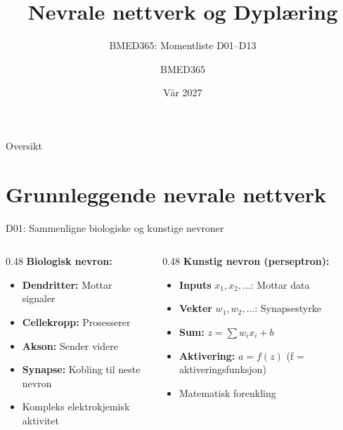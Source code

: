\documentclass[aspectratio=169, 10pt]{beamer}
\title{Nevrale nettverk og Dyplæring}
\subtitle{BMED365: Momentliste D01--D13}
\author{BMED365}
\date{Vår 2027}
\begin{document}
\begin{frame}
    \titlepage
\end{frame}

\begin{frame}{Oversikt}
    \tableofcontents
\end{frame}

\section{Grunnleggende nevrale nettverk}

\begin{frame}{D01: Sammenligne biologiske og kunstige nevroner}
    \begin{columns}[T]
        \begin{column}{0.48\textwidth}
            \textbf{Biologisk nevron:}
            \begin{itemize}
                \item \textbf{Dendritter:} Mottar signaler
                \item \textbf{Cellekropp:} Prosesserer
                \item \textbf{Akson:} Sender videre
                \item \textbf{Synapse:} Kobling til neste nevron
                \item Kompleks elektrokjemisk aktivitet
            \end{itemize}
        \end{column}
        \begin{column}{0.48\textwidth}
            \textbf{Kunstig nevron (perseptron):}
            \begin{itemize}
                \item \textbf{Inputs} $x_1, x_2, \ldots$: Mottar data
                \item \textbf{Vekter} $w_1, w_2, \ldots$: Synapsestyrke
                \item \textbf{Sum:} $z = \sum w_i x_i + b$
                \item \textbf{Aktivering:} $a = f(z)$ \small(f = aktiveringsfunksjon)
                \item Matematisk forenkling
            \end{itemize}
        \end{column}
    \end{columns}
    

\end{frame}
\end{document}
